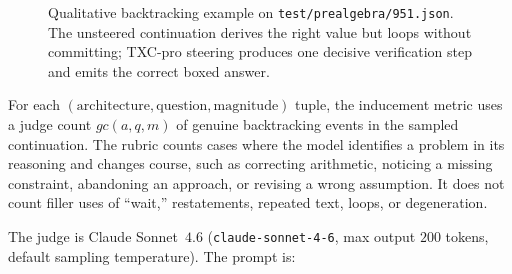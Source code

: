 \begin{figure}[t]
    \centering
    \scriptsize
    \setlength{\fboxsep}{4pt}

    \begin{minipage}[t]{0.49\linewidth}
    \end{minipage}\hfill
    \begin{minipage}[t]{0.49\linewidth}
    \end{minipage}

    \caption{Qualitative backtracking example on \texttt{test/prealgebra/951.json}. The unsteered continuation derives the right value but loops without committing; TXC-pro steering produces one decisive verification step and emits the correct boxed answer.}
    \label{fig:c7-headline-text-app}
\end{figure}

For each $(\text{architecture}, \text{question}, \text{magnitude})$ tuple, the inducement metric uses a judge count $gc(a,q,m)$ of genuine backtracking events in the sampled continuation. The rubric counts cases where the model identifies a problem in its reasoning and changes course, such as correcting arithmetic, noticing a missing constraint, abandoning an approach, or revising a wrong assumption. It does not count filler uses of ``wait,'' restatements, repeated text, loops, or degeneration.

The judge is Claude Sonnet~$4.6$ (\texttt{claude-sonnet-4-6}, max output $200$ tokens, default sampling temperature). The prompt is:

